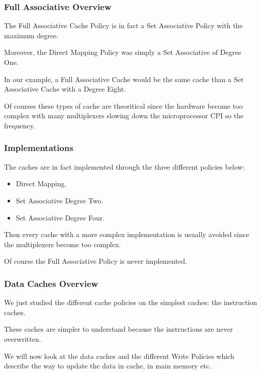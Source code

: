 
\begin{frame}
  \frametitle{Full Associative Overview}

  The Full Associative Cache Policy is in fact a Set Associative Policy
  with the maximum degree.

  \nl

  Moreover, the Direct Mapping Policy was simply a Set Associative of
  Degree One.

  \nl

  In our example, a Full Associative Cache would be the same cache than a
  Set Associative Cache with a Degree Eight.

  \nl

  Of courses these types of cache are theoritical since the
  hardware become too complex with many multiplexers slowing down
  the microprocessor CPI so the frequency.
\end{frame}


\begin{frame}
  \frametitle{Implementations}

  The caches are in fact implemented through the three different policies
  below:

  \begin{itemize}[<+->]
    \item
      Direct Mapping.
    \item
      Set Associative Degree Two.
    \item
      Set Associative Degree Four.
  \end{itemize}

  Then every cache with a more complex implementation is usually avoided
  since the multiplexers become too complex.

  \nl

  Of course the Full Associative Policy is never implemented.
\end{frame}


\begin{frame}
  \frametitle{Data Caches Overview}

  We just studied the different cache policies on the simplest caches:
  the instruction caches.

  \nl

  These caches are simpler to understand because the instructions are
  never overwritten.

  \nl

  We will now look at the data caches and the different Write Policies
  which describe the way to update the data in cache, in main memory etc.
\end{frame}

